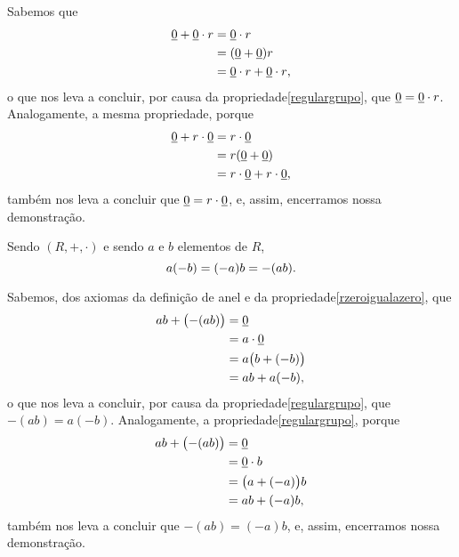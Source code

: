 \begin{dem}
  Sabemos que
  \begin{equation*}
    \begin{aligned}
      \underline{0} + \underline{0}\cdot r &= \underline{0}\cdot r\\
                   &= (\underline{0}+\underline{0})r\\
                   &= \underline{0}\cdot r + \underline{0}\cdot r\mathrm{,}
    \end{aligned}
  \end{equation*}
  o que nos leva a concluir,
  por causa da propriedade\xspace\ref{regulargrupo}, que
  $\underline{0} = \underline{0}\cdot r$. Analogamente, a mesma propriedade, porque
  \begin{equation*}
    \begin{aligned}
      \underline{0} + r\cdot \underline{0} &= r\cdot \underline{0}\\
                   &= r(\underline{0}+\underline{0})\\
                   &= r\cdot \underline{0} + r\cdot \underline{0}\mathrm{,}
    \end{aligned}
  \end{equation*}
  também nos leva a concluir que $\underline{0} = r\cdot \underline{0}$, e, assim,
  encerramos nossa
  demonstração.
\end{dem}

\begin{Propr}
  Sendo $(R,+,\cdot)$ e sendo $a$ e $b$ elementos de $R$,
  \begin{equation*}
    a(-b) = (-a)b = -(ab)\mathrm{.}
  \end{equation*}
\end{Propr}

\begin{dem}
  Sabemos, dos axiomas da definição de anel e da
  propriedade\xspace\ref{rzeroigualazero}, que
  \begin{equation*}
    \begin{aligned}
      ab + \bigl(-(ab)\bigr) &= \underline{0}\\
                             &= a\cdot \underline{0}\\
                             &= a\bigl(b+(-b)\bigr)\\
                             &= ab + a(-b)\mathrm{,}
    \end{aligned}
  \end{equation*}
  o que nos leva a concluir,
  por causa da propriedade\xspace\ref{regulargrupo}, que
  $-(ab) = a(-b)$. Analogamente, a propriedade\xspace\ref{regulargrupo},
  porque
  \begin{equation*}
    \begin{aligned}
      ab + \bigl(-(ab)\bigr) &= \underline{0}\\
                             &= \underline{0}\cdot b\\
                             &= \bigl(a+(-a)\bigr)b\\
                             &= ab + (-a)b\mathrm{,}
    \end{aligned}
  \end{equation*}
  também nos leva a concluir que $-(ab) = (-a)b$, e, assim,
  encerramos nossa
  demonstração.
\end{dem}

